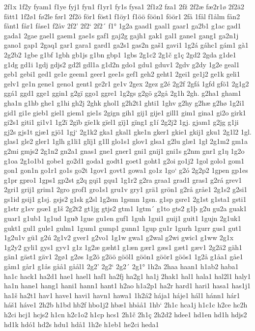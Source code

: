 2f1x
1f2y
fyam1
f1ye
fyj1
fyn1
f1yr1
fy1s
fysa1
2f1z2
fza1
2fž
2f2æ
fæ2r1ø
2f2ä2
fätt1
1f2ø1
fø2le
før1
2f2ö
för1
föst1
f1öy1
f1öö
föön1
föör1
2få
1fål
f1ålm
fån2
fånt1
får1
fåse1
f2åv
2f2'
2f2`
2f2´
f1°
1g2a
gaad1
gaal1
gaar1
ga2b1
g1ac
gad1
gada1
2gae
gael1
gaem1
gae1s
gaf1
gaj2g
gajh1
gak1
gal1
gane1
gang1
ga2n1j
gano1
gap1
2gaq1
gar1
gara1
gard1
ga2s1
gas2n
gaš1
gavi1
1g2á
gáhc1
gám1
gà1
2g2b2
1gbe
g1bf
1gbh
gb1js
g1bn
gbp1
1gbs
2g1c2
2g1č
g1ç
2gd2
2gda
g1de1
g1dg
gd1i
1gdj
gdjs2
gd2l
gdl1a
g1d2n
gdo1
gdu1
gduv1
2gdv
g2dy
1g2e
geal1
geb1
gebi1
ged1
ge1e
geem1
geer1
gee1s
gef1
geh2
geht1
2gei1
ge1j2
ge1k
geli1
gelv1
ge1n
gene1
geno1
gent1
ge2r1
ge1v
2gex
2gez
g2é
2g2f
2gfá
1gfd
gfö1
2g1g2
ggá1
ggd1
gge1
ggin1
g2gï
ggo1
ggre1
1g2gs
g2gö
g2gå
2g1h
2gh.
g2ha1
gham1
gha1n
g1hb
ghe1
g1hi
gh2j
2ghk
ghol1
g2h2t1
ghti1
1ghv
g2hy
g2hæ
g2hø
1g2i1
gid1
gi1e
gieb1
giel1
giem1
gie1s
2gign
gih1
gij1
gije1
gill1
gim1
gina1
gi2o
girk1
gi2s1
giti1
gi1v1
1g2ï
2gïb
gïe1k
gïel1
gïj1
gïng1
g1í
2g2j2
1gj.
gjam1
g2jg
g1ji
gj2s
gjs1t
gjæ1
gjö1
1gj`
2g1k2
gka1
gkal1
gke1n
gker1
gkie1
gkij1
gku1
2g1l2
1gl.
glas1
gle2
gler1
1glh
g1li1
glïj1
g1ll
glo1s1
glov1
glsa1
g2lu
glæ1
1gł
2g1m2
gm1a
g2mi
gmjs2
2g1n2
gn2a1
gnas1
gne1
gner1
gni1
gnij1
gni1s
g2nm
gnr1
g1ŋ
1g2o
g1oa
2g1o1b1
gobe1
go2d1
goda1
godt1
goet1
goht1
g2oi
go1j2
1gol
golo1
gom1
gon1
gon1n
go1r1
go1s
go2t
1gov1
govt1
gowa1
go1z
1go`
g2ó
2g2p2
1gpen
gp1es
g1pr
gpro1
1gps1
gp2st
g2q
gqi1
gqu1
1g1r2
g2ra
graa1
grad1
gras1
g2rá
grev1
2gri1
grij1
grim1
2gro
grof1
gro1s1
gru1v
gry1
grä1
grön1
g2rå
gråe1
2g1s2
g2si1
gs1id
gsij1
g1sj.
gsjs2
g1sk
g2sl
1g2sm
1gsmn
1gsn.
g1sp
gsre1
2g1st
g1sta1
gsti1
g1str
g1sv
gsæ1
g1š
2g2t2
gt1jg
gtjs2
gtm1
1gtm´
g1to
gts2
g1þ
g2u
gu2a
guak1
guar1
g1ub1
1g1ud
1guð
1gue
gu1en
guf1
1guh
1gui1
guij1
guit1
1gujn
2g1uk1
gukt1
gul1
gule1
gulm1
1gum1
gump1
gunn1
1gup
gu1r
1gurh
1gurr
gus1
gut1
1g2u1v
gü1
g2ú
2g1v2
gver1
g2vo1
1g1w
gwa1
g2wal
g2wi
gwic1
g1ww
2g1x
1g2y2
gyli1
gys1
gyv1
g1z
1g2æ
gæht1
g1æn
gær1
gæs1
gæt1
gæv1
2g2ä2
gäh1
gän1
gäst1
gäv1
2gø1
g2øs
1g2ö
g2öö
gööl1
göön1
göör1
göös1
1g2å
g1åa1
gåe1
gåm1
går1
g1ås
gåå1
gåål1
2g2'
2g2`
2g2´
2g1°
1h2a
2haa
haan1
h1ab2
haba1
ha1c
hack1
ha2d1
hae1
hael1
haf1
ha2fj
ha2g1
ha1j
2hak1
hal1
hala1
hal2l1
haly1
ha1n
hane1
hang1
hani1
hann1
hant1
h2ao
h1a2p1
ha2r
hard1
hari1
hasa1
has1j1
ha1š
ha2t1
hav1
have1
havi1
havn1
hawa1
1h2á2
hája1
háje1
hál1
hánn1
hár1
háš1
háve1
2h2b
h1bd
hb2f
hbo1j2
hbæ1
hbåå1
1hb`
2h1c
hca1j
h1c1c
h2ce
hc2h
h2ci
hcj1
hcjs2
h1cn
h2c1o2
h1cp
hcs1
2h1č
2h1ç
2h2d2
hdee1
hd1en
hd1h
hdjs2
hd1k
hdó1
hd2s
hdu1
hdå1
1h2e
h1eb1
he2ci
heda1
